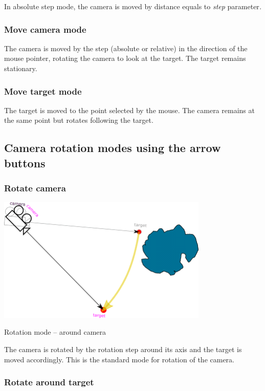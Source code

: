 In absolute step mode, the camera is moved by distance equals to \emph{step}
parameter\emph{.}

\subsubsection{Move camera mode}\label{move-camera-mode-1}

The camera is moved by the step (absolute or relative) in the direction of the
mouse pointer, rotating the camera to look at the target. The target remains
stationary.

\subsubsection{Move target mode}\label{move-target-mode-1}

The target is moved to the point selected by the mouse. The camera remains at
the same point but rotates following the target.

\subsection{Camera rotation modes using the arrow
	buttons}\label{camera-rotation-modes-using-the-arrow-buttons}

\subsubsection{Rotate camera}\label{rotate-camera}

\includegraphics[width=3.95347in,height=2.34861in]{img/manual/media/image14.png}

Rotation mode -- around camera

The camera is rotated by the rotation step around its axis and the target is
moved accordingly. This is the standard mode for rotation of the camera.

\subsubsection{Rotate around target}\label{rotate-around-target}

